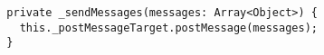 \begin{verbatim}
  private _sendMessages(messages: Array<Object>) {
    this._postMessageTarget.postMessage(messages);
  }
\end{verbatim}
